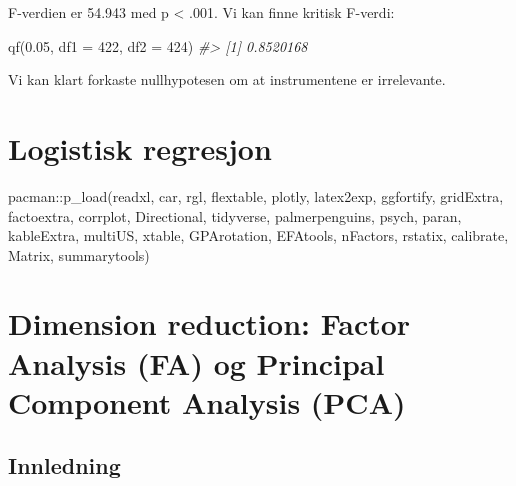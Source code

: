 \documentclass[
]{article}
\newenvironment{Shaded}{\begin{snugshade}}{\end{snugshade}}
\newcommand{\AttributeTok}[1]{\textcolor[rgb]{0.77,0.63,0.00}{#1}}
\newcommand{\CommentTok}[1]{\textcolor[rgb]{0.56,0.35,0.01}{\textit{#1}}}
\newcommand{\DecValTok}[1]{\textcolor[rgb]{0.00,0.00,0.81}{#1}}
\newcommand{\FloatTok}[1]{\textcolor[rgb]{0.00,0.00,0.81}{#1}}
\newcommand{\FunctionTok}[1]{\textcolor[rgb]{0.00,0.00,0.00}{#1}}
\newcommand{\NormalTok}[1]{#1}
\newcommand{\SpecialCharTok}[1]{\textcolor[rgb]{0.00,0.00,0.00}{#1}}
\begin{document}
F-verdien er 54.943 med p \textless{} .001. Vi kan finne kritisk F-verdi:

\begin{Shaded}
\begin{Highlighting}[]
\FunctionTok{qf}\NormalTok{(}\FloatTok{0.05}\NormalTok{, }\AttributeTok{df1 =} \DecValTok{422}\NormalTok{, }\AttributeTok{df2 =} \DecValTok{424}\NormalTok{)}
\CommentTok{\#\textgreater{} [1] 0.8520168}
\end{Highlighting}
\end{Shaded}

Vi kan klart forkaste nullhypotesen om at instrumentene er irrelevante.

\hypertarget{logistisk-regresjon}{%
\section{Logistisk regresjon}\label{logistisk-regresjon}}

\begin{Shaded}
\begin{Highlighting}[]
\NormalTok{pacman}\SpecialCharTok{::}\FunctionTok{p\_load}\NormalTok{(readxl, car, rgl, flextable, plotly, latex2exp, ggfortify, gridExtra, factoextra, corrplot, Directional, tidyverse, palmerpenguins, psych, paran, kableExtra, multiUS, xtable, GPArotation, EFAtools, nFactors, rstatix, calibrate, Matrix, summarytools)}
\end{Highlighting}
\end{Shaded}

\hypertarget{dimension-reduction-factor-analysis-fa-og-principal-component-analysis-pca}{%
\section{Dimension reduction: Factor Analysis (FA) og Principal Component Analysis (PCA)}\label{dimension-reduction-factor-analysis-fa-og-principal-component-analysis-pca}}

\hypertarget{innledning-2}{%
\subsection{Innledning}\label{innledning-2}}
\end{document}
